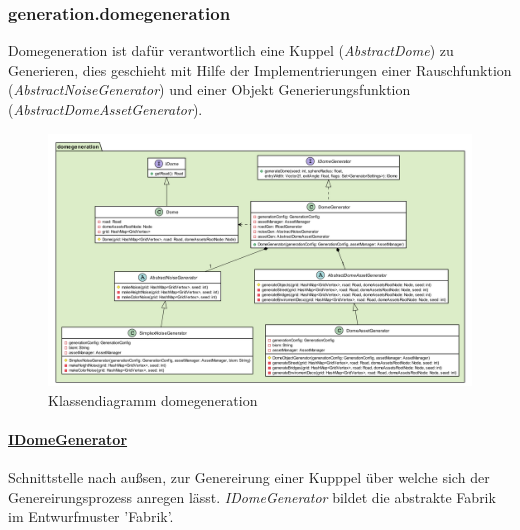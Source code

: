 \subsubsection{generation.domegeneration}
    Domegeneration ist dafür verantwortlich eine Kuppel (\textit{AbstractDome}) zu Generieren,
    dies geschieht mit Hilfe der Implementrierungen einer Rauschfunktion (\textit{AbstractNoiseGenerator})
    und einer Objekt Generierungsfunktion (\textit{AbstractDomeAssetGenerator}). \par
   
    \begin{figure}[htbp]
        \centering
        \includegraphics[width=\linewidth]{./Generierung/Bilder/domegeneration.png}
        \caption{Klassendiagramm domegeneration}
    \end{figure}


        \paragraph{\underline{IDomeGenerator}} \mbox{}\par
            Schnittstelle nach außsen, zur Genereirung einer Kupppel über welche sich der Genereirungsprozess
            anregen lässt. \textit{IDomeGenerator} bildet die abstrakte Fabrik im Entwurfmuster 'Fabrik'. \par
            
